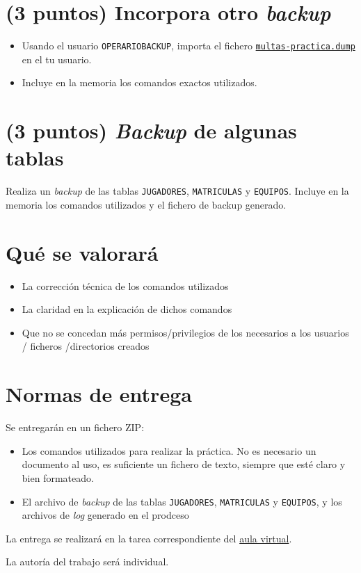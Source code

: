 \documentclass[a4paper]{article}
\begin{document}
\section*{(3 puntos) Incorpora otro \emph{backup}}
\label{sec:org000000c}
\begin{itemize}
\item Usando el usuario \texttt{OPERARIOBACKUP}, importa el fichero \href{https://alvarogonzalezsotillo.github.io/apuntes-clase/sistemas-gestores-bbdd-asir2/apuntes/2/multas-practica.dump}{\texttt{multas-practica.dump}} en el tu usuario.
\item Incluye en la memoria los comandos exactos utilizados.
\end{itemize}

\section*{(3 puntos) \emph{Backup} de algunas tablas}
\label{sec:org000000f}
Realiza un \emph{backup} de las tablas \texttt{JUGADORES}, \texttt{MATRICULAS} y \texttt{EQUIPOS}. Incluye en la memoria los comandos utilizados y el fichero de backup generado.  

\section*{Qué se valorará}
\label{sec:org0000012}
\begin{itemize}
\item La corrección técnica de los comandos utilizados
\item La claridad en la explicación de dichos comandos
\item Que no se concedan más permisos/privilegios de los necesarios a los usuarios / ficheros /directorios creados
\end{itemize}

\section*{Normas de entrega}
\label{sec:org0000015}
Se entregarán en un fichero ZIP:
\begin{itemize}
\item Los comandos utilizados para realizar la práctica. No es necesario un documento al uso, es suficiente un fichero de texto, siempre que esté claro y bien formateado.
\item El archivo de \emph{backup} de las tablas \texttt{JUGADORES}, \texttt{MATRICULAS} y \texttt{EQUIPOS}, y los archivos de \emph{log} generado en el prodceso
\end{itemize}

La entrega se realizará en la tarea correspondiente del \href{https://aulavirtual3.educa.madrid.org/ies.alonsodeavellan.alcala}{aula virtual}.

La autoría del trabajo será individual.
\end{document}
